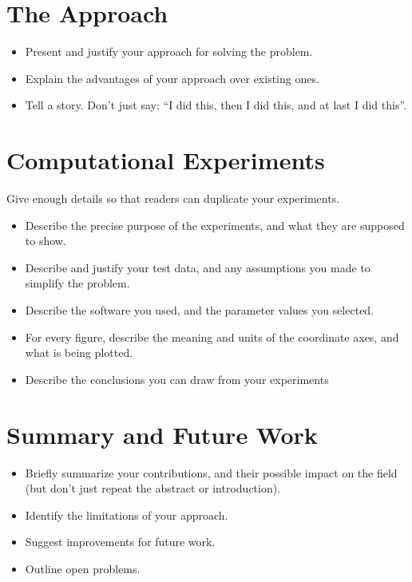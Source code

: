 \documentclass[10pt]{article}
\begin{document}
\section{The Approach}
\begin{itemize}
	\item Present and justify your approach for solving the problem. 
	\item Explain the advantages of your approach over existing ones.
	
	\item Tell a story.
	Don't just say: ``I did this, then I did this, and at last I did this''.
\end{itemize}

\section{Computational Experiments}
Give enough details so that readers can duplicate your experiments.

\begin{itemize}
	\item Describe the precise purpose of the experiments, and what they 
	are supposed to show.
	
	\item Describe and justify your test data, and any assumptions you made to 
	simplify the problem.
	
	\item Describe the software you used, and the 
	parameter values you selected.
	
	\item 
	For every figure, describe the meaning and units of the coordinate axes, 
	and what is being plotted.
	
	\item Describe the conclusions you can draw from your experiments
\end{itemize}

\section{Summary and Future Work}
\begin{itemize}
	\item Briefly summarize your contributions, and their possible
	impact on the field (but don't just repeat the abstract or introduction).
	\item Identify the limitations of your approach.
	\item Suggest improvements for future work.
	\item Outline open problems.
\end{itemize}



 
%

\end{document}
